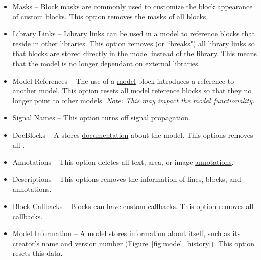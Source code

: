 \documentclass{article}
\begin{document}
\begin{itemize}
	\item Masks -- Block \href{https://www.mathworks.com/help/simulink/ug/block-masks.html}{masks} are commonly used to customize the block appearance of custom blocks. This option removes the masks of all blocks. 
	
	\item Library Links -- Library \href{https://www.mathworks.com/help/simulink/ug/creating-and-working-with-linked-blocks.html}{links} can be used in a model to reference blocks that reside in other libraries. This option removes (or ``breaks") all library links so that blocks are stored directly in the model instead of the library. This means that the model is no longer dependant on external libraries.
	
	\item Model References -- The use of a \href{https://www.mathworks.com/help/simulink/slref/model.html}{model} block introduces a reference to another model. This option resets all model reference blocks so that they no longer point to other models. \emph{Note: This may impact the model functionality.}
	
	\item Signal Names -- This option turns off \href{https://www.mathworks.com/help/simulink/ug/signal-label-propagation.html}{signal propagation}.
	
	\item DocBlocks -- A \docblock stores \href{https://www.mathworks.com/help/simulink/slref/docblock.html}{documentation} about the model. This options removes all .
	
	\item Annotations -- This option deletes all text, area, or image \href{https://www.mathworks.com/help/simulink/ug/annotations.html}{annotations}.
	
	\item Descriptions -- This options removes the  information of \href{https://www.mathworks.com/help/simulink/ug/signal-basics.html#bs9gzwp}{lines}, \href{https://www.mathworks.com/help/simulink/ug/block-properties-dialog-box.html}{blocks}, and annotations. 
	
	\item Block Callbacks -- Blocks can have custom \href{https://www.mathworks.com/help/simulink/ug/block-callbacks.html}{callbacks}. This option removes all callbacks.
	
	\item Model Information -- A \Simulink model stores \href{https://www.mathworks.com/help/simulink/ug/managing-model-versions.html}{information} about itself, such as its creator's name and version number (Figure~\ref{fig:model_history}). This option resets this data.
	

\end{itemize}
\end{document}
